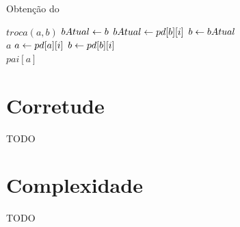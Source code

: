 \begin{algorithm}[H]
\caption{Obtenção do \LCA}
\begin{algorithmic}[1]
        \State $troca(a, b)$
    \EndIf
    \State $bAtual \leftarrow b$
            \State $bAtual \leftarrow pd[b][i]$
        \EndIf
    \EndFor
    \State $b \leftarrow bAtual$
        \\\hspace{11mm} \Return $a$
    \EndIf
            \State $a \leftarrow pd[a][i]$
            \State $b \leftarrow pd[b][i]$
        \EndIf
    \EndFor
    \\\hspace{5mm} \Return $pai[a]$
\EndFunction
\end{algorithmic}
\end{algorithm}

\section{Corretude}

TODO

\section{Complexidade}

TODO
